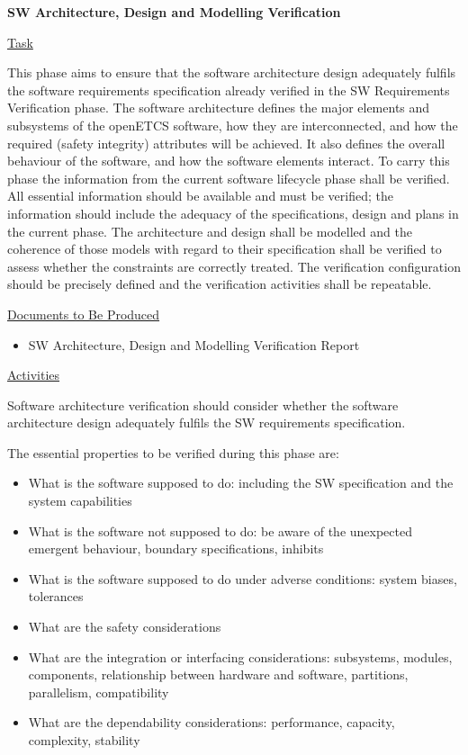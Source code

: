 \documentclass{template/openetcs_report}
\begin{document}
\textbf{SW Architecture, Design and Modelling Verification}

\underline{Task} 

This phase aims to ensure that the software architecture design
adequately fulfils the software requirements specification already
verified in the SW Requirements Verification phase. 
The software architecture defines the major elements and subsystems of
the openETCS software, how they are interconnected, and how the
required (safety integrity) attributes will be achieved. It also
defines the overall behaviour of the software, and how the software
elements interact.  
To carry this phase the information from the current software
lifecycle phase shall be verified. All essential information should be
available and must be verified; the information should include the
adequacy of the specifications, design and plans in the current phase.  
The architecture and design shall be modelled and the coherence of
those models with regard to their specification shall be verified to
assess whether the constraints are correctly treated. 
The verification configuration should be precisely defined and the
verification activities shall be repeatable. 

\underline{Documents to Be Produced} 

\begin{itemize}
\item SW Architecture, Design and Modelling Verification Report
\end{itemize}

\underline{Activities}

Software architecture verification should consider whether the
software architecture design adequately fulfils the SW requirements
specification.  

The essential properties to be verified during this phase are:

\begin{itemize}
\item What is the software supposed to do: including the SW specification and the system capabilities
\item What is the software not supposed to do: be aware of the
  unexpected emergent behaviour, boundary specifications, inhibits 
\item What is the software supposed to do under adverse conditions: system biases, tolerances
\item What are the safety considerations
\item What are the integration or interfacing considerations:
  subsystems, modules, components, relationship between hardware and
  software, partitions, parallelism, compatibility 
\item What are the dependability considerations: performance, capacity, complexity, stability
\end{itemize}
\end{document}
